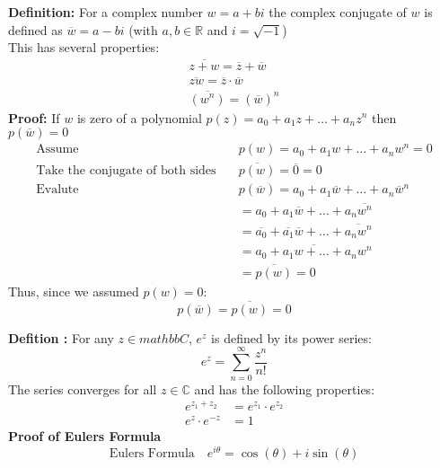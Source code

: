 \documentclass[a4paper, 8pt]{extarticle}
\begin{document}
\begin{examplebox}[Define the complex conjugate ($\overline{w}$) and prove if $w$ is a zero of a polynomial $p(z)$ = $a_0 + a_1 z + \ldots + a_n z^n$ then $\overline{w}$ is also a zero of $p(z)$ ]
	\label{sol:2021Q1b}
	\textbf{Definition:} For a complex number $w = a+bi$ the complex conjugate of $w$ is defined as $\overline{w} = a - bi$ (with $a,b \in \mathbb{R}$ and $i = \sqrt{-1}$)\\
	This has several properties:
	\begin{align*}
		\overline{z+w} = \overline{z} + \overline{w}    \\
		\overline{zw} = \overline{z} \cdot \overline{w} \\
		\overline{(w^n)} = \left(\overline{w}\right)^n
	\end{align*}
	\textbf{Proof:} If $w$ is zero of a polynomial $p(z) = a_0 + a_1 z + \ldots + a_n z^n$ then $p(\overline{w}) = 0$
	\begin{align*}
		\text{Assume} \quad                           & p(w) = a_0 + a_1 w + \ldots + a_n w^n = 0                                    \\
		\text{Take the conjugate of both sides} \quad & \overline{p(w)} = \overline{0} = 0                                           \\
		\text{Evalute} \quad                          & p(\overline{w}) = a_0 + a_1 \overline{w} + \ldots + a_n \overline{w}^n       \\
		                                              & = a_0 + a_1 \overline{w} + \ldots + a_n \overline{w^n}                       \\
		                                              & = \overline{a_0} + \overline{a_1} \overline{w} + \ldots + \overline{a_n w^n} \\
		                                              & = \overline{a_0 + a_1 w + \ldots + a_n w^n}                                  \\
		                                              & = \overline{p(w)} = 0
	\end{align*}
	Thus, since we assumed $p(w) = 0$:
	$$p(\overline{w}) = \overline{p(w)} = 0$$
\end{examplebox}
\begin{examplebox}[Define the complex exponential function $e^z$ and prove Eulers Foruma $e^{i \theta} = \cos(\theta) + i\sin\theta$]
	\textbf{Defition :} For any $z \in mathbb{C}$, $e^z$ is defined by its power series:
	$$e^z = \sum_{n=0}^{\infty} \frac{z^n}{n!}$$
	The series converges for all $z \in \mathbb{C}$ and has the following properties:
	\begin{align*}
		e^{z_1 + z_2}      & = e^{z_1} \cdot e^{z_2} \\
		e^{z} \cdot e^{-z} & = 1
	\end{align*}
	\textbf{Proof of Eulers Formula}
	$$\text{Eulers Formula} \quad e^{i \theta} = \cos(\theta) + i\sin(\theta)$$
\end{examplebox}
\
\end{document}
